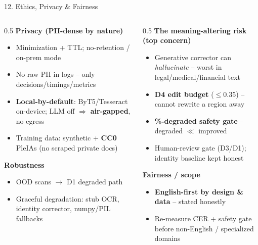 \documentclass[10pt,aspectratio=169]{beamer}
\begin{document}
\begin{frame}{12. Ethics, Privacy \& Fairness}
\begin{columns}[T]
\begin{column}{0.5\textwidth}
\textbf{Privacy (PII-dense by nature)}
\begin{itemize}\small
  \item Minimization + TTL; no-retention / on-prem mode
  \item No raw PII in logs -- only decisions/timings/metrics
  \item \textbf{Local-by-default}: ByT5/Tesseract on-device; LLM off $\Rightarrow$ \textbf{air-gapped}, no egress
  \item Training data: synthetic + \textbf{CC0} PleIAs (no scraped private docs)
\end{itemize}

\textbf{Robustness}
\begin{itemize}\small
  \item OOD scans $\rightarrow$ D1 degraded path
  \item Graceful degradation: stub OCR, identity corrector, numpy/PIL fallbacks
\end{itemize}
\end{column}
\begin{column}{0.5\textwidth}
\textbf{The meaning-altering risk (top concern)}
\begin{itemize}\small
  \item Generative corrector can \emph{hallucinate} -- worst in legal/medical/financial text
  \item \textbf{D4 edit budget} ($\le$0.35) -- cannot rewrite a region away
  \item \textbf{\%-degraded safety gate} -- degraded $\ll$ improved
  \item Human-review gate (D3/D1); identity baseline kept honest
\end{itemize}

\textbf{Fairness / scope}
\begin{itemize}\small
  \item \textbf{English-first by design \& data} -- stated honestly
  \item Re-measure CER + safety gate before non-English / specialized domains
\end{itemize}
\end{column}
\end{columns}
\end{frame}
\end{document}

